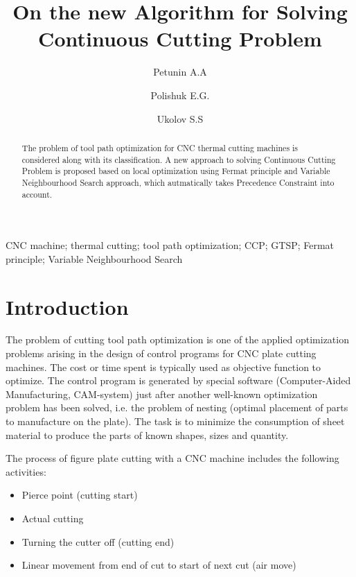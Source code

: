 \documentclass{ifacconf}
\begin{document}
\begin{frontmatter}

\title{On the new Algorithm for Solving Continuous Cutting Problem}

\author[urfu]{Petunin A.A}
\author[urfu]{Polishuk E.G.}
\author[urfu]{Ukolov S.S}

\address[urfu]{Ural Federal University, Yekaterinburg, Russia}

\begin{abstract}                %
The problem of tool path optimization
for CNC thermal cutting machines is considered
along with its classification.
A new approach to solving
Continuous Cutting Problem
is proposed
based on local optimization
using Fermat principle
and Variable Neighbourhood Search approach,
which autmatically takes
Precedence Constraint into account.
\end{abstract}

\begin{keyword}
CNC machine; thermal cutting;
tool path optimization;
CCP; GTSP;
Fermat principle;
Variable Neighbourhood Search
\end{keyword}

\end{frontmatter}

\section{Introduction}

The problem of cutting tool path optimization
is one of the applied optimization problems arising
in the design of control programs for CNC plate cutting machines.
The cost or time spent is typically used
as objective function to optimize.
The control program is generated by special software
(Computer-Aided Manufacturing, CAM-system)
just after another well-known optimization problem
has been solved,
i.e. the problem of nesting
(optimal placement of parts to manufacture on the plate).
The task is to minimize the consumption of sheet material
to produce the parts of known shapes, sizes and quantity.

The process of figure plate cutting with a CNC machine includes
the following activities:
\begin{itemize}
    \item{Pierce point} (cutting start)
    \item{Actual cutting}
    \item{Turning the cutter off} (cutting end)
    \item{Linear movement from end of cut to start of next cut} (air move)
\end{itemize}
\end{document}

